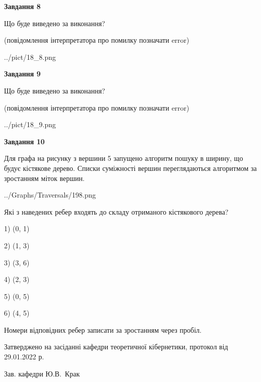 \documentclass[12pt, ukrainian]{article}
\begin{document}
{\begin {large}
{\begin {center}\textbf{Завдання 8}\end {center}}\par
Що буде виведено за виконання?\par
 (повідомлення інтерпретатора про помилку позначати error)\par
\begin{center}
	{../pict/18_8.png}
\end{center}
\newpage

{\begin {center}\textbf{Завдання 9}\end {center}}\par
Що буде виведено за виконання?\par
 (повідомлення інтерпретатора про помилку позначати error)\par
\begin{center}
	{../pict/18_9.png}
\end{center}
\newpage

{\begin {center}\textbf{Завдання 10}\end {center}}\par
Для графа на рисунку з вершини 5 запущено алгоритм пошуку в ширину, що будує кістякове дерево. Списки суміжності вершин переглядаються алгоритмом за зростанням міток вершин.\par
\begin{center}
	{../Graphs/Traversals/198.png}
\end{center}
\par Які з наведених ребер входять до складу отриманого кістякового дерева?\par
1) (0, 1)\par
2) (1, 3)\par
3) (3, 6)\par
4) (2, 3)\par
5) (0, 5)\par
6) (4, 5)\par
{\vskip 15pt} Номери відповідних ребер записати за зростанням через пробіл.\par
\newpage


\end {large}
}
{\smallskip \begin {small} Затверджено на засіданні кафедри теоретичної кібернетики, протокол  від   29.01.2022 р.\par\smallskip\smallskip
{\parbox {6.5 cm}{Зав. кафедри \dotfill Ю.В.~Крак}} \end{small}}
\end{document}
